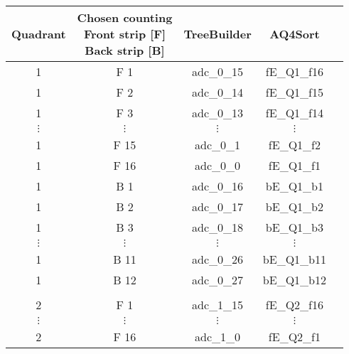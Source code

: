 \begin{tabular}{ccccc}
\hline
Quadrant  & \shortstack{Chosen counting \\ Front strip [F] \\ Back strip [B]} & TreeBuilder & AQ4Sort     \\
\hline
1         & F 1                                                              & adc\_0\_15  & fE\_Q1\_f16 \\
1         & F 2                                                              & adc\_0\_14  & fE\_Q1\_f15 \\
1         & F 3                                                              & adc\_0\_13  & fE\_Q1\_f14 \\
$\vdots$  & $\vdots$                                                         & $\vdots$    & $\vdots$    \\
1         & F 15                                                             & adc\_0\_1   & fE\_Q1\_f2  \\
1         & F 16                                                             & adc\_0\_0   & fE\_Q1\_f1  \\
1         & B 1                                                              & adc\_0\_16  & bE\_Q1\_b1  \\
1         & B 2                                                              & adc\_0\_17  & bE\_Q1\_b2  \\
1         & B 3                                                              & adc\_0\_18  & bE\_Q1\_b3  \\
$\vdots$  & $\vdots$                                                         & $\vdots$    & $\vdots$    \\
1         & B 11                                                             & adc\_0\_26  & bE\_Q1\_b11 \\
1         & B 12                                                             & adc\_0\_27  & bE\_Q1\_b12 \\
          &                                                                  &             &             \\
2         & F 1                                                              & adc\_1\_15  & fE\_Q2\_f16 \\
$\vdots$  & $\vdots$                                                         & $\vdots$    & $\vdots$    \\
2         & F 16                                                             & adc\_1\_0   & fE\_Q2\_f1  \\

\end{tabular}
